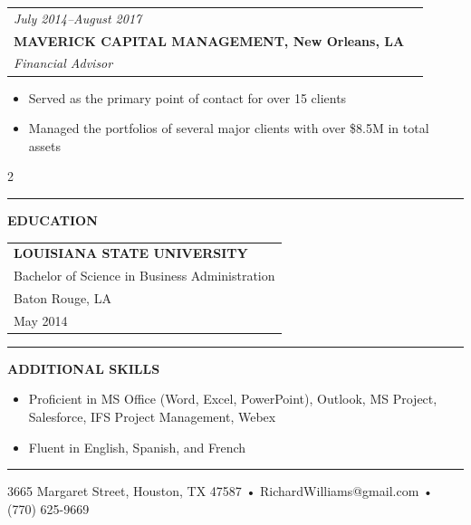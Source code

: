 \documentclass[11pt]{article}
\makeatletter
\newcommand{\resumeItem}[1]{
  \item \small{#1}\vspace{-2pt}
}
\newcommand{\resumeSection}[1]{
  \vspace{2mm}
  \par\noindent\textcolor{black}{\rule{2pt}{0.35cm}}
  \hspace{1mm}\textbf{\large #1}\par
  \vspace{1mm}
}
\newenvironment{resumeSubsection}
  {\begin{tabular*}{\textwidth}{@{\hspace{-0.5em}\extracolsep{\fill}}ll}}
  {\end{tabular*}}
\makeatother
\begin{document}
\vspace{1em}
\begin{resumeSubsection}
  \vspace{0.5em}
  \textit {July 2014--August 2017} \\
  \textbf{MAVERICK CAPITAL MANAGEMENT, New Orleans, LA} \\
  \textit{Financial Advisor}
\end{resumeSubsection}
\begin{itemize}
  \setlength{\leftmargin}{0.5em}
  \resumeItem{Served as the primary point of contact for over 15 clients}
  \resumeItem{Managed the portfolios of several major clients with over \$8.5M in total assets}
\end{itemize}

\vspace{0.3em}
\begin{multicols}{2}
\resumeSection{EDUCATION}

\vspace{-1em}
\begin{tabular}{@{\hspace{-0.7em}}l@{}}
  \textbf{LOUISIANA STATE UNIVERSITY} \\
  Bachelor of Science in Business Administration \\
  Baton Rouge, LA \\
  May 2014 \\
\end{tabular}

\columnbreak

\resumeSection{ADDITIONAL SKILLS}
\vspace{-1em}
\begin{itemize}
  \setlength{\leftmargin}{0.5em}
  \resumeItem{Proficient in MS Office (Word, Excel, PowerPoint), Outlook, MS Project, Salesforce, IFS Project Management, Webex}
  \resumeItem{Fluent in English, Spanish, and French}
\end{itemize}
\end{multicols}

\vfill
\noindent\rule{\textwidth}{2pt}
\vspace{-1.5em}
\begin{center}
    \small 3665 Margaret Street, Houston, TX 47587 • RichardWilliams@gmail.com • (770) 625-9669
\end{center}
\end{document}
